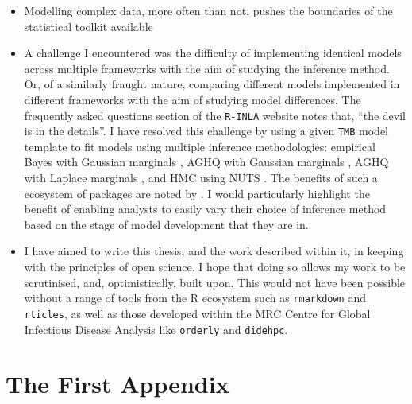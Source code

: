 \documentclass[a4paper, nobind]{templates/ociamthesis}
\providecommand{\tightlist}{%
  \setlength{\itemsep}{0pt}\setlength{\parskip}{0pt}}
\newcommand*{\bibtitle}{Works Cited}
\begin{document}
\begin{itemize}
\tightlist
\item
  Modelling complex data, more often than not, pushes the boundaries of the statistical toolkit available
\item
  A challenge I encountered was the difficulty of implementing identical models across multiple frameworks with the aim of studying the inference method. Or, of a similarly fraught nature, comparing different models implemented in different frameworks with the aim of studying model differences. The frequently asked questions section of the \texttt{R-INLA} website \autocite{rinla2023faq} notes that, ``the devil is in the details''. I have resolved this challenge by using a given \texttt{TMB} model template to fit models using multiple inference methodologies: empirical Bayes with Gaussian marginals \autocite{kristensen2016tmb}, AGHQ with Gaussian marginals \autocite{stringer2021implementing}, AGHQ with Laplace marginals \autocite{howes2023integrated}, and HMC using NUTS \autocite{monnahan2018no}. The benefits of such a ecosystem of packages are noted by \textcite{stringer2021fields}. I would particularly highlight the benefit of enabling analysts to easily vary their choice of inference method based on the stage of model development that they are in.
\item
  I have aimed to write this thesis, and the work described within it, in keeping with the principles of open science. I hope that doing so allows my work to be scrutinised, and, optimistically, built upon. This would not have been possible without a range of tools from the R ecosystem such as \texttt{rmarkdown} and \texttt{rticles}, as well as those developed within the MRC Centre for Global Infectious Disease Analysis like \texttt{orderly} and \texttt{didehpc}.
\end{itemize}

\startappendices

\hypertarget{the-first-appendix}{%
\chapter{The First Appendix}\label{the-first-appendix}}




\setlength{\baselineskip}{0pt} %

{\renewcommand*\MakeUppercase[1]{#1}%
\printbibliography[heading=bibintoc,title={\bibtitle}]}
\end{document}
